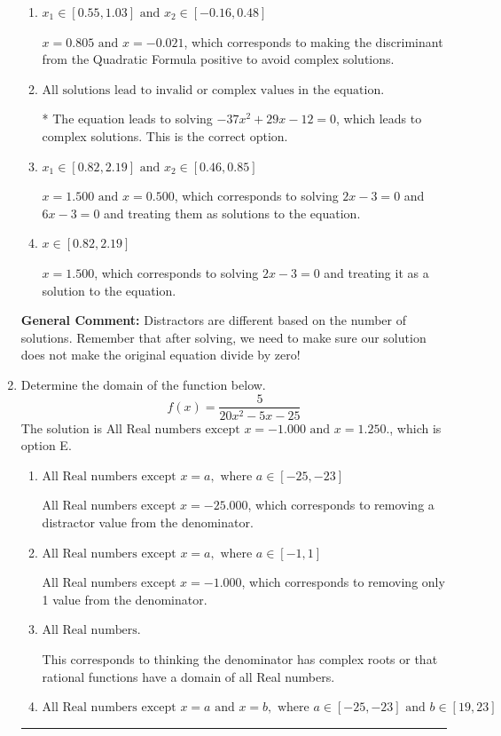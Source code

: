\documentclass{extbook}[14pt]
\newcommand{\litem}[1]{\item #1

\rule{\textwidth}{0.4pt}}
\begin{document}
\begin{enumerate}
{\begin{enumerate}[label=\Alph*.]
$x = 0.500$, which corresponds to solving $6x -3 = 0$ and treating it as a solution to the equation.
\item \( x_1 \in [0.55, 1.03] \text{ and } x_2 \in [-0.16,0.48] \)

$x = 0.805 \text{ and } x = -0.021$, which corresponds to making the discriminant from the Quadratic Formula positive to avoid complex solutions.
\item \( \text{All solutions lead to invalid or complex values in the equation.} \)

* The equation leads to solving $-37x^{2} +29 x -12=0$, which leads to complex solutions. This is the correct option.
\item \( x_1 \in [0.82, 2.19] \text{ and } x_2 \in [0.46,0.85] \)

$x = 1.500 \text{ and } x = 0.500$, which corresponds to solving $2x -3 = 0$ and $6x -3 = 0$ and treating them as solutions to the equation.
\item \( x \in [0.82,2.19] \)

$x = 1.500$, which corresponds to solving $2x -3 = 0$ and treating it as a solution to the equation.
\end{enumerate}

\textbf{General Comment:} Distractors are different based on the number of solutions. Remember that after solving, we need to make sure our solution does not make the original equation divide by zero!
}
\litem{
Determine the domain of the function below.
\[ f(x) = \frac{5}{20x^{2} -5 x -25} \]The solution is \( \text{All Real numbers except } x = -1.000 \text{ and } x = 1.250. \), which is option E.\begin{enumerate}[label=\Alph*.]
\item \( \text{All Real numbers except } x = a, \text{ where } a \in [-25, -23] \)

All Real numbers except $x = -25.000$, which corresponds to removing a distractor value from the denominator.
\item \( \text{All Real numbers except } x = a, \text{ where } a \in [-1, 1] \)

All Real numbers except $x = -1.000$, which corresponds to removing only 1 value from the denominator.
\item \( \text{All Real numbers.} \)

This corresponds to thinking the denominator has complex roots or that rational functions have a domain of all Real numbers.
\item \( \text{All Real numbers except } x = a \text{ and } x = b, \text{ where } a \in [-25, -23] \text{ and } b \in [19, 23] \)


\end{enumerate}}
\end{enumerate}
\end{document}

